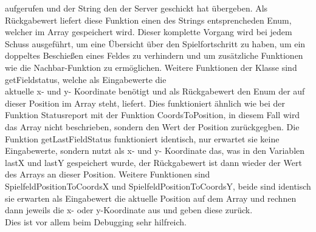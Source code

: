 aufgerufen und der String den der Server geschickt hat übergeben. Als Rückgabewert liefert diese Funktion einen des Strings entsprencheden Enum, welcher im Array gespeichert wird. 
Dieser komplette Vorgang wird bei jedem Schuss ausgeführt, um eine Übersicht über den Spielfortschritt zu haben, um ein doppeltes Beschießen eines Feldes zu verhindern und um 
zusätzliche Funktionen wie die Nachbar-Funktion zu ermöglichen. Weitere Funktionen der Klasse sind getFieldstatus, welche als Eingabewerte die \\aktuelle x- und y- Koordinate benötigt 
und als Rückgabewert den Enum der auf dieser Position im Array steht, liefert. Dies funktioniert ähnlich wie bei der Funktion Statusreport mit der Funktion CoordsToPosition, in diesem 
Fall wird das Array nicht beschrieben, sondern den Wert der Position zurückgegben. Die Funktion getLastFieldStatus funktioniert identisch, nur erwartet sie keine Eingabewerte, sondern 
nutzt als x- und y- Koordinate das, was in den Variablen lastX und lastY gespeichert wurde, der Rückgabewert ist dann wieder der Wert des Arrays an dieser Position. Weitere Funktionen 
sind SpielfeldPositionToCoordsX und SpielfeldPositionToCoordsY, beide sind identisch sie erwarten als Eingabewert die aktuelle Position auf dem Array und rechnen dann jeweils die x- 
oder y-Koordinate aus und geben diese zurück. \\Dies ist vor allem beim Debugging sehr hilfreich.


